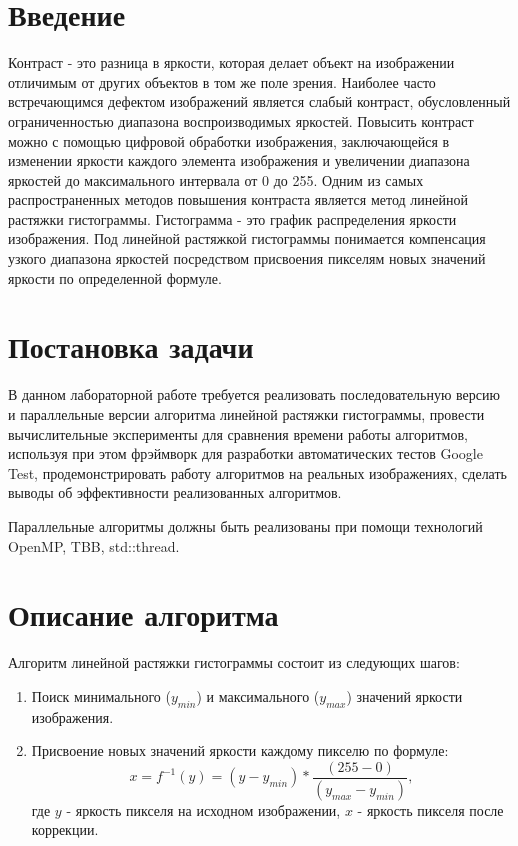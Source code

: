 \documentclass{report}
\begin{document}
\setcounter{page}{2}

\tableofcontents
\newpage

\section*{Введение}
\par Контраст - это разница в яркости, которая делает объект на изображении отличимым от других объектов в том же поле зрения. Наиболее часто встречающимся дефектом изображений является слабый контраст, обусловленный ограниченностью диапазона воспроизводимых яркостей. Повысить контраст можно с помощью цифровой обработки изображения, заключающейся в изменении яркости каждого элемента изображения и увеличении диапазона яркостей до максимального интервала от 0 до 255. Одним из самых распространенных методов повышения контраста является метод линейной растяжки гистограммы. Гистограмма - это график распределения яркости изображения. Под линейной растяжкой гистограммы понимается компенсация узкого диапазона яркостей посредством присвоения пикселям новых значений яркости по определенной формуле.
\newpage

\section*{Постановка задачи}
\par В данном лабораторной работе требуется реализовать последовательную версию и параллельные версии алгоритма линейной растяжки гистограммы, провести вычислительные эксперименты для сравнения времени работы алгоритмов, используя при этом фрэймворк для разработки автоматических тестов Google Test, продемонстрировать работу алгоритмов на реальных изображениях, сделать выводы об эффективности реализованных алгоритмов.
\par Параллельные алгоритмы должны быть реализованы при помощи технологий OpenMP, TBB, std::thread.
\newpage

\section*{Описание алгоритма}
\par Алгоритм линейной растяжки гистограммы состоит из следующих шагов:
\begin{enumerate}
\item Поиск минимального ($y_{min}$) и максимального ($y_{max}$) значений яркости изображения.
\item Присвоение новых значений яркости каждому пикселю по формуле: $$x = f^{-1}(y) = (y - y_{min}) * \frac{(255 - 0)}{(y_{max} - y_{min})},$$
где $y$ - яркость пикселя на исходном изображении, $x$ - яркость пикселя после коррекции.
\end{enumerate}
\newpage
\end{document}
